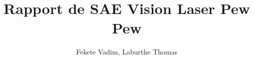 \documentclass[12pt, letterpaper]{article}
\title{Rapport de SAE Vision Laser Pew Pew}
\author{Fekete Vadim, Laburthe Thomas}
\begin{document}
\begin{titlepage}
\maketitle
\end{titlepage}
\end{document}
